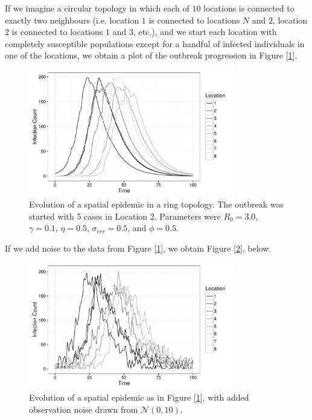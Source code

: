	If we imagine a circular topology in which each of $10$ locations is connected to exactly two neighbours (i.e. location $1$ is connected to locations $N$ and $2$, location $2$ is connected to locations $1$ and $3$, etc.), and we start each location with completely susceptible populations except for a handful of infected individuals in one of the locations, we obtain a plot of the outbreak progression in Figure [\ref{dataplot}].

	\begin{figure}
        \centering
        \captionsetup{width=.8\linewidth}
        \includegraphics[width=0.8\textwidth]{./images/dataplot.pdf}
        \caption{Evolution of a spatial epidemic in a ring topology. The outbreak was started with 5 cases in Location 2. Parameters were $R_0 = 3.0$, $\gamma = 0.1$, $\eta = 0.5$, $\sigma_{err} = 0.5$, and $\phi = 0.5$. \label{dataplot}}
    \end{figure}

    If we add noise to the data from Figure [\ref{dataplot}], we obtain Figure [\ref{dataplot2}], below.

    \begin{figure}
        \centering
        \captionsetup{width=.8\linewidth}
        \includegraphics[width=0.8\textwidth]{./images/dataplot2.pdf}
        \caption{Evolution of a spatial epidemic as in Figure [\ref{dataplot}], with added observation noise drawn from $\mathcal{N}(0,10)$. \label{dataplot2}}
    \end{figure}


